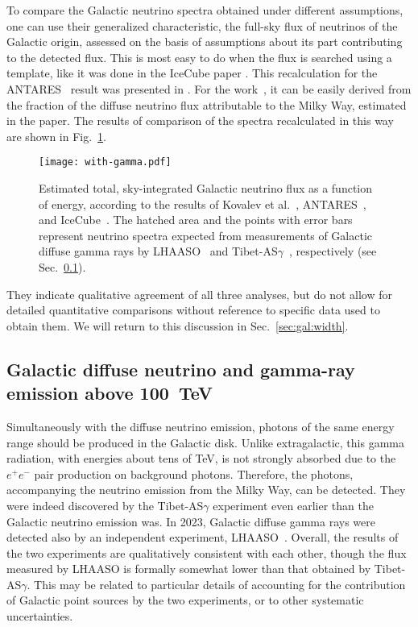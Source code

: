 \documentclass[a4paper,noshowpacs,noshowkeys,floatfix,twocolumn,preprintnumbers,nofootinbib]{revtex4-2}
\begin{document}
To compare the Galactic neutrino spectra obtained under different
assumptions, one can use their generalized characteristic, the full-sky flux of neutrinos of the Galactic origin, assessed on the basis of assumptions about its part contributing to the detected flux. This is most easy to do when the flux is searched using a template, like it was done in the IceCube paper \cite{IceCube-gal-Science}. This recalculation for the ANTARES~\cite{ANTARES-ridge} result was presented in \cite{ANTARES-ICRC2023-G1}. For the work~\cite{neutgalaxy}, it can be easily derived from the fraction of the diffuse neutrino flux attributable to the Milky Way, estimated in the paper. The results of comparison of the spectra recalculated in this way are shown in Fig.~\ref{fig:gal-nu-spec}.
\begin{figure}
\centerline{\texttt{[image: with-gamma.pdf]}}
\caption{\label{fig:gal-nu-spec}
Estimated total, sky-integrated Galactic neutrino flux as a function of energy, according to the results of Kovalev et al.~\cite{neutgalaxy}, ANTARES~\cite{ANTARES-ridge, ANTARES-ICRC2023-G1}, and IceCube~\cite{IceCube-gal-Science}. The hatched area and the points with error bars represent neutrino spectra expected from measurements of Galactic diffuse gamma rays by LHAASO~\cite{LHAASODiffuseGal} and
Tibet-AS$\gamma$~\cite{TibetDiffuseGal}, respectively (see 
Sec.~\ref{sec:gal:gamma}). }
\end{figure}
They indicate qualitative agreement of all three analyses, but do not allow for detailed quantitative comparisons without reference to specific data used to obtain them. We will return to this discussion in Sec.~\ref{sec:gal:width}.

\subsection{Galactic diffuse neutrino and gamma-ray emission above 100~TeV}
\label{sec:gal:gamma}
Simultaneously with the diffuse neutrino emission, photons of the same energy range should be produced in the Galactic disk. Unlike extragalactic, this gamma radiation, with energies about tens of TeV, is not strongly absorbed due to the $e^{+}e^{-}$ pair production on background photons. Therefore, the photons, accompanying the neutrino emission from the Milky Way, can be detected. They were indeed discovered by the Tibet-AS$\gamma$ experiment \cite{TibetDiffuseGal} even earlier than the Galactic neutrino emission was. In 2023, Galactic diffuse gamma rays were detected also by an independent experiment, LHAASO~\cite{LHAASODiffuseGal}. Overall, the results of the two experiments are qualitatively consistent with each other, though the flux measured by LHAASO is formally somewhat lower than that obtained by Tibet-AS$\gamma$. This may be related to particular details of accounting for the contribution of Galactic point sources by the two experiments, or to other systematic uncertainties.
\end{document}
